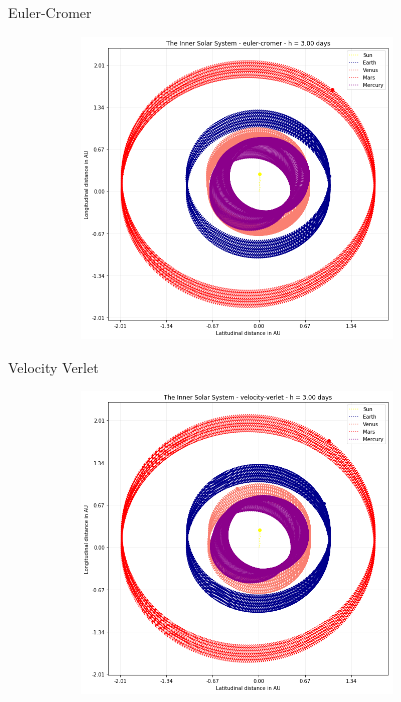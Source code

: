 \documentclass{beamer}
\begin{document}
    \begin{frame}{Euler-Cromer}

      \begin{figure}[h]
        \vspace{-0.5cm}
        \includegraphics[width=100mm, height = 80mm]{resources/cromer3.png}
      \end{figure}

    \end{frame}

    \begin{frame}{Velocity Verlet}

      \begin{figure}[h]
        \vspace{-0.5cm}
        \includegraphics[width=100mm, height = 80mm]{resources/verlet3.png}
      \end{figure}

    \end{frame}
\end{document}
